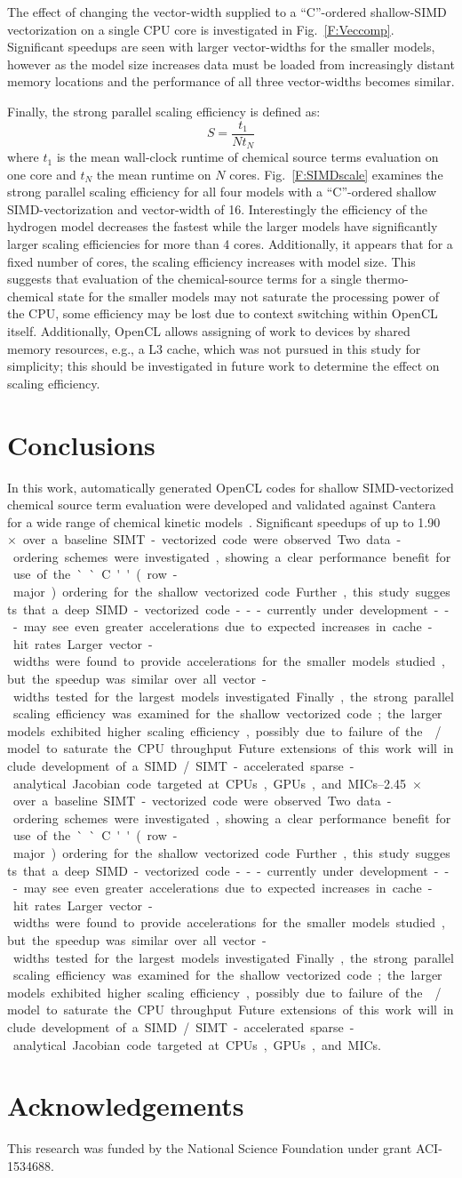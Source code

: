 \documentclass[12pt]{ussci}
\begin{document}
The effect of changing the vector-width supplied to a ``C''-ordered shallow-SIMD vectorization on a single CPU core is investigated in Fig.~\ref{F:Veccomp}.
Significant speedups are seen with larger vector-widths for the smaller models, however as the model size increases data must be loaded from increasingly distant memory locations and the performance of all three vector-widths becomes similar.

Finally, the strong parallel scaling efficiency is defined as:
\begin{equation}
S = \frac{t_1}{N t_N}
\end{equation}
where $t_1$ is the mean wall-clock runtime of chemical source terms evaluation on one core and $t_N$ the mean runtime on $N$ cores.
Fig.~\ref{F:SIMDscale} examines the strong parallel scaling efficiency for all four models with a ``C''-ordered shallow SIMD-vectorization and vector-width of 16.
Interestingly the efficiency of the hydrogen model decreases the fastest while the larger models have significantly larger scaling efficiencies for more than 4 cores.
Additionally, it appears that for a fixed number of cores, the scaling efficiency increases with model size.
This suggests that evaluation of the chemical-source terms for a single thermo-chemical state for the smaller models may not saturate the processing power of the CPU, some efficiency may be lost due to context switching within OpenCL itself.
Additionally, OpenCL allows assigning of work to devices by shared memory resources, e.g., a L3 cache, which was not pursued in this study for simplicity; this should be investigated in future work to determine the effect on scaling efficiency.

\section{Conclusions}
In this work, automatically generated OpenCL codes for shallow SIMD-vectorized chemical source term evaluation were developed and validated against Cantera~\cite{Cantera} for a wide range of chemical kinetic models~\cite{Burke:2011fh,smith_gri-mech_30,Wang:2007,Sarathy:2013jr}.
Significant speedups of up to \SIrange{1.90}{2.45}{$\times$} over a baseline SIMT-vectorized code were observed.
Two data-ordering schemes were investigated, showing a clear performance benefit for use of the ``C'' (row-major) ordering for the shallow vectorized code.
Further, this study suggests that a deep SIMD-vectorized code---currently under development---may see even greater accelerations due to expected increases in cache-hit rates.
Larger vector-widths were found to provide accelerations for the smaller models studied, but the speedup was similar over all vector-widths tested for the largest models investigated.
Finally, the strong parallel scaling efficiency was examined for the shallow vectorized code; the larger models exhibited higher scaling efficiency, possibly due to failure of the \slash{} model to saturate the CPU throughput.
Future extensions of this work will include development of a SIMD\slash SIMT-accelerated sparse-analytical Jacobian code targeted at CPUs, GPUs, and MICs.

\section{Acknowledgements}
This research was funded by the National Science Foundation under grant ACI-1534688.

\printbibliography[heading=bibintoc]
\end{document}
